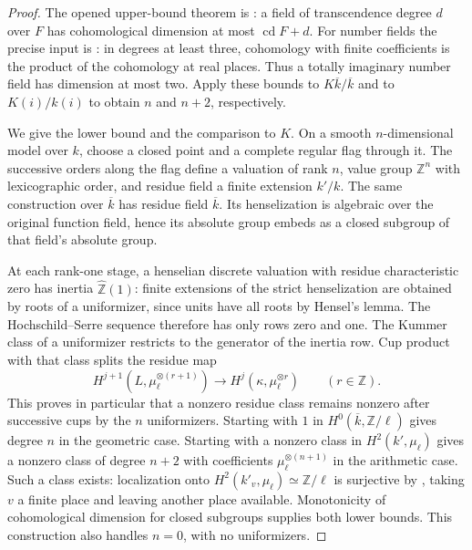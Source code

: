 \begin{proof}
The opened upper-bound theorem is
\cite[Theorem 15.2]{AB_MilneLEC}: a field of transcendence degree $d$
over $F$ has cohomological dimension at most $\operatorname{cd}F+d$.
For number fields the precise input is
\cite[Theorem I.4.10(c)]{AB_MilneADT}: in degrees at least three,
cohomology with finite coefficients is the product of the cohomology
at real places. Thus a totally imaginary number field has dimension
at most two. Apply these bounds to $K\overline k/\overline k$ and
to $K(i)/k(i)$ to obtain $n$ and $n+2$, respectively.

We give the lower bound and the comparison to $K$. On a smooth
$n$-dimensional model over $k$, choose a closed point and a complete
regular flag through it. The successive orders along the flag define
a valuation of rank $n$, value group $\mathbb Z^n$ with lexicographic
order, and residue field a finite extension $k'/k$. The same construction
over $\overline k$ has residue field $\overline k$. Its henselization
is algebraic over the original function field, hence its absolute group
embeds as a closed subgroup of that field's absolute group.

At each rank-one stage, a henselian discrete valuation with residue
characteristic zero has inertia $\widehat{\mathbb Z}(1)$: finite
extensions of the strict henselization are obtained by roots of a
uniformizer, since units have all roots by Hensel's lemma. The
Hochschild--Serre sequence therefore has only rows zero and one.
The Kummer class of a uniformizer restricts to the generator of the
inertia row. Cup product with that class splits the residue map
\[
 H^{j+1}(L,\mu_\ell^{\otimes(r+1)})
       \longrightarrow H^j(\kappa,\mu_\ell^{\otimes r})
       \qquad(r\in\mathbb Z).
\]
This proves in particular that a nonzero residue class remains nonzero
after successive cups by the $n$ uniformizers. Starting with $1$ in
$H^0(\overline k,\mathbb Z/\ell)$ gives degree $n$ in the geometric
case. Starting with a nonzero class in $H^2(k',\mu_\ell)$ gives a nonzero
class of degree $n+2$ with coefficients $\mu_\ell^{\otimes(n+1)}$
in the arithmetic case. Such a class exists: localization onto
$H^2(k'_v,\mu_\ell)\simeq\mathbb Z/\ell$ is surjective by
\cite[Theorem I.2.1 and Corollary I.4.16]{AB_MilneADT}, taking $v$
a finite place and leaving another place available. Monotonicity of
cohomological dimension for closed subgroups supplies both lower bounds.
This construction also handles $n=0$, with no uniformizers.


\end{proof}
